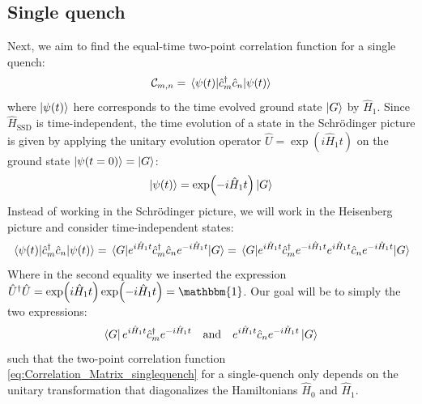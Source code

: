 \documentclass[11pt, a4paper, oneside]{book}
\theoremstyle{definition} %
\begin{document}
\subsection{Single quench}

Next, we aim to find the equal-time two-point correlation function for a single quench:
	\begin{equation}
	\mathcal{C}_{m,n} = \mel{\psi(t)}{\hat{c}_m^\dagger \hat{c}_n}{\psi(t)}	
	\end{equation}
where $\ket{\psi(t)}$ here corresponds to the time evolved ground state $\ket{G}$ by $\hat{H}_1$. Since $\hat{H}_\text{SSD}$ is time-independent, the time evolution of a state in the Schrödinger picture is given by applying the unitary evolution operator $\hat{U} = \exp(i\hat{H}_\text{1} t)$ on the ground state $\ket{\psi(t=0)} = \ket{G}$:
	\begin{equation}
		\ket{\psi(t)} = \exp(-i \hat{H}_1 t) \ket{G}
	\end{equation}
Instead of working in the Schrödinger picture, we will work in the Heisenberg picture and consider time-independent states:
	\begin{equation}
		\mel{\psi(t)}{\hat{c}_m^\dagger \hat{c}_n}{\psi(t)} = \mel{G}{e^{i \hat{H}_1 t} \hat{c}_m^\dagger \hat{c}_n e^{-i \hat{H}_1 t}}{G} = \mel{G}{e^{i\hat{H}_1 t} \hat{c}_m^\dagger e^{-i \hat{H}_1 t} e^{i \hat{H}_1 t} \hat{c}_n e^{-i\hat{H}_1 t}}{G}
		\label{eq:Correlation_Matrix_singlequench}
	\end{equation}
	Where in the second equality we inserted the expression $\hat{U}^\dagger \hat{U} = \exp(i \hat{H}_1 t)\exp(-i \hat{H}_1 t) = \mathbbm{1}$. Our goal will be to simply the two expressions:
	\begin{equation}
		\bra{G} e^{i\hat{H}_1 t} \hat{c}_m^\dagger e^{-i \hat{H}_1 t} \qq{and}  e^{i \hat{H}_1 t} \hat{c}_n e^{-i\hat{H}_1 t}\ket{G}
	\end{equation}
	such that the two-point correlation function \ref{eq:Correlation_Matrix_singlequench} for a single-quench only depends on the unitary transformation that diagonalizes the Hamiltonians $\hat{H}_0$ and $\hat{H}_1$. \\
	
\end{document}
